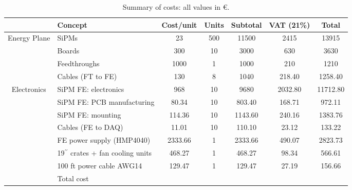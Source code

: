 \documentclass[a4paper,11pt,oneside]{article}
\begin{document}
\begin{table}[!h]
  \begin{center}
    \begin{tabular}{|c|l|cccc|c|}
      \hline
      & Concept & Cost/unit & Units & Subtotal & VAT
      (21\%) & Total\\
      \hline
      \multirow{4}{*}{Energy Plane} & SiPMs & 23 & 500 & 11500 & 2415 & 13915\\
      & Boards & 300 & 10 & 3000 & 630 & 3630\\
      & Feedthroughs & 1000 & 1 & 1000 & 210 & 1210\\
      & Cables (FT to FE) & 130 & 8 & 1040 & 218.40 & 1258.40\\
      \hline
      \multirow{7}{*}{Electronics} & SiPM FE: electronics & 968 & 10 &
      9680 & 2032.80 & 11712.80\\
      & SiPM FE: PCB manufacturing & 80.34 & 10 & 803.40 & 168.71 & 972.11\\
      & SiPM FE: mounting & 114.36 & 10 & 1143.60 & 240.16 & 1383.76\\
      & Cables (FE to DAQ) & 11.01 & 10 & 110.10 & 23.12 & 133.22\\
      & FE power supply (HMP4040) & 2333.66 & 1 & 2333.66 &
      490.07 & 2823.73\\
      & 19$^{\prime\prime}$ crates + fan cooling units & 468.27 & 1 & 468.27 & 98.34 & 566.61\\
      & 100 ft power cable AWG14 & 129.47 & 1 & 129.47 & 27.19 & 156.66\\
      \hline
      & Total cost & & & & & \\
      \hline
    \end{tabular}
    \caption{Summary of costs: all values in \euro.}
    \label{tab:UpCost}
  \end{center}
\end{table}
\end{document}

